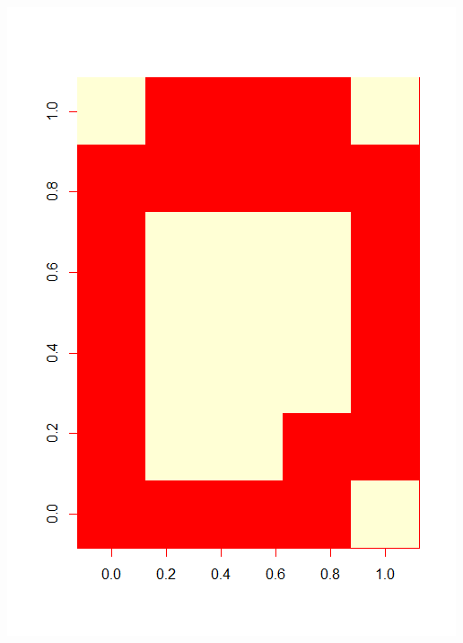 \hspace{-4ex}\begin{minipage}{0.2\linewidth}
\includegraphics[width = \textwidth]{Figures/data0}

\end{minipage}
